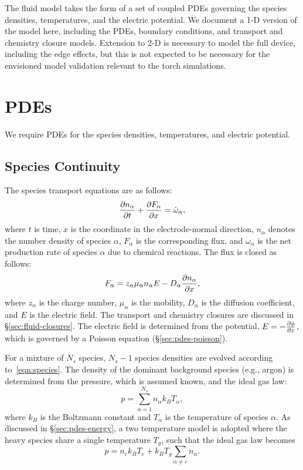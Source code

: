 The fluid model takes the form of a set of coupled PDEs governing the
species densities, temperatures, and the electric potential.  We
document a 1-D version of the model here, including the PDEs, boundary
conditions, and transport and chemistry closure models.  Extension to
2-D is necessary to model the full device, including the edge effects,
but this is not expected to be necessary for the envisioned model
validation relevant to the torch simulations.

\section{PDEs}
We require PDEs for the species densities, temperatures, and electric potential.

\subsection{Species Continuity}
The species transport equations are as follows:
%
\begin{equation}
\frac{\partial n_{\alpha}}{\partial t} + \frac{\partial F_{\alpha}}{\partial x} = \dot{\omega}_{\alpha},
\label{eqn:species}
\end{equation}
%
where $t$ is time, $x$ is the coordinate in the electrode-normal
direction, $n_{\alpha}$ denotes the number density of species
$\alpha$, $F_{\alpha}$ is the corresponding flux, and
$\dot{\omega}_{\alpha}$ is the net production rate of species $\alpha$
due to chemical reactions.  The flux is closed as follows:
%
\begin{equation*}
F_{\alpha} = z_{\alpha} \mu_{\alpha} n_{\alpha} E - D_{\alpha} \frac{\partial n_{\alpha}}{\partial x},
\end{equation*}
%
where $z_{\alpha}$ is the charge number, $\mu_{\alpha}$ is the
mobility, $D_{\alpha}$ is the diffusion coefficient, and $E$ is the
electric field.  The transport and chemistry closures are discussed in
\S\ref{sec:fluid-closures}.  The electric field is determined from the
potential, $E = -\frac{\partial \phi}{\partial x}$, which is governed by a Poisson
equation (\S\ref{sec:pdes-poisson}).

For a mixture of $N_s$ species, $N_s - 1$ species densities are
evolved according to~\eqref{eqn:species}.  The density of the dominant
background species (e.g., argon) is determined from the pressure,
which is assumed known, and the ideal gas law:
%
\begin{equation*}
p = \sum_{\alpha = 1}^{N_s} n_{\alpha} k_B T_{\alpha},
\end{equation*}
%
where $k_B$ is the Boltzmann constant and $T_{\alpha}$ is the
temperature of species $\alpha$.  As discussed in
\S\ref{sec:pdes-energy}, a two temperature model is adopted where the
heavy species share a single temperature $T_g$, such that the ideal
gas law becomes
%
\begin{equation*}
p = n_e k_B T_e + k_B T_g \sum_{\alpha \neq e} n_{\alpha}.
\end{equation*}
%


